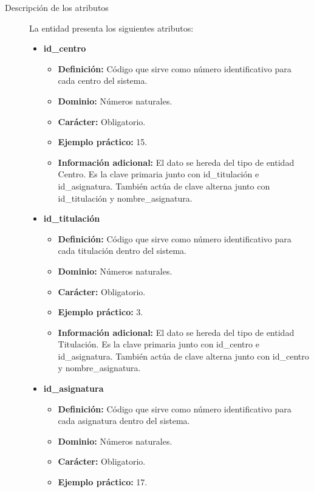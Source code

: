 \begin{description}
   \item[Descripción de los atributos] La entidad presenta los siguientes
   atributos:

   \begin{itemize}
   \item \textbf{id\_centro}
      \begin{itemize}
         \item \textbf{Definición:} Código que sirve como número identificativo
               para cada centro del sistema.
         \item \textbf{Dominio:} Números naturales.
         \item \textbf{Carácter:} Obligatorio.
         \item \textbf{Ejemplo práctico:} 15.
         \item \textbf{Información adicional:} El dato se hereda del tipo de
         entidad Centro. Es la clave primaria junto con id\_titulación e
         id\_asignatura. También actúa de clave alterna junto con
         id\_titulación y nombre\_asignatura.
      \end{itemize}
   \item \textbf{id\_titulación}
      \begin{itemize}
         \item \textbf{Definición:} Código que sirve como número identificativo
         para cada titulación dentro del sistema.
         \item \textbf{Dominio:} Números naturales.
         \item \textbf{Carácter:} Obligatorio.
         \item \textbf{Ejemplo práctico:} 3.
         \item \textbf{Información adicional:} El dato se hereda del tipo de
         entidad Titulación. Es la clave primaria junto con id\_centro e
         id\_asignatura. También actúa de clave alterna junto con
         id\_centro y nombre\_asignatura.
      \end{itemize}
   \item \textbf{id\_asignatura}
      \begin{itemize}
         \item \textbf{Definición:} Código que sirve como número identificativo
         para cada asignatura dentro del sistema.
         \item \textbf{Dominio:} Números naturales.
         \item \textbf{Carácter:} Obligatorio.
         \item \textbf{Ejemplo práctico:} 17.

\end{itemize}
\end{itemize}
\end{description}
